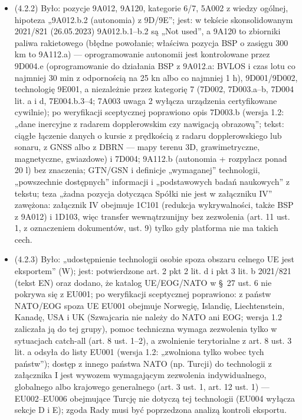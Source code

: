 \documentclass[12pt,a4paper]{report}
\begin{document}
\begin{itemize}
  \item (4.2.2) Było: pozycje 9A012, 9A120, kategorie 6/7, 5A002 z wiedzy ogólnej, hipoteza „9A012.b.2 (autonomia) z 9D/9E”; jest: w tekście skonsolidowanym 2021/821 (26.05.2023) 9A012.b.1--b.2 są „Not used”, a 9A120 to zbiorniki paliwa rakietowego (błędne powołanie; właściwa pozycja BSP o zasięgu 300 km to 9A112.a) --- oprogramowanie autonomii jest kontrolowane przez 9D004.e (oprogramowanie do działania BSP z 9A012.a: BVLOS i czas lotu co najmniej 30 min z odpornością na 25 kn albo co najmniej 1 h), 9D001/9D002, technologię 9E001, a niezależnie przez kategorię 7 (7D002, 7D003.a--b, 7D004 lit. a i d, 7E004.b.3--4; 7A003 uwaga 2 wyłącza urządzenia certyfikowane cywilnie); po weryfikacji sceptycznej poprawiono opis 7D003.b (wersja 1.2: „dane inercyjne z radarem dopplerowskim czy nawigacją obrazową”; tekst: ciągłe łączenie danych o kursie z prędkością z radaru dopplerowskiego lub sonaru, z GNSS albo z DBRN --- mapy terenu 3D, grawimetryczne, magnetyczne, gwiazdowe) i 7D004; 9A112.b (autonomia + rozpylacz ponad 20 l) bez znaczenia; GTN/GSN i definicje „wymaganej” technologii, „powszechnie dostępnych” informacji i „podstawowych badań naukowych” z tekstu; teza „żadna pozycja dotycząca Spółki nie jest w załączniku IV” zawężona: załącznik IV obejmuje 1C101 (redukcja wykrywalności, także BSP z 9A012) i 1D103, więc transfer wewnątrzunijny bez zezwolenia (art. 11 ust. 1, z oznaczeniem dokumentów, ust. 9) tylko gdy platforma nie ma takich cech.
  \item (4.2.3) Było: „udostępnienie technologii osobie spoza obszaru celnego UE jest eksportem” (W); jest: potwierdzone art. 2 pkt 2 lit. d i pkt 3 lit. b 2021/821 (tekst EN) oraz dodano, że katalog UE/EOG/NATO w §~27 ust. 6 nie pokrywa się z EU001; po weryfikacji sceptycznej poprawiono: z państw NATO/EOG spoza UE EU001 obejmuje Norwegię, Islandię, Liechtenstein, Kanadę, USA i UK (Szwajcaria nie należy do NATO ani EOG; wersja 1.2 zaliczała ją do tej grupy), pomoc techniczna wymaga zezwolenia tylko w sytuacjach catch-all (art. 8 ust. 1--2), a zwolnienie terytorialne z art. 8 ust. 3 lit. a odsyła do listy EU001 (wersja 1.2: „zwolniona tylko wobec tych państw”); dostęp z innego państwa NATO (np. Turcji) do technologii z załącznika I jest wywozem wymagającym zezwolenia indywidualnego, globalnego albo krajowego generalnego (art. 3 ust. 1, art. 12 ust. 1) --- EU002--EU006 obejmujące Turcję nie dotyczą tej technologii (EU004 wyłącza sekcje D i E); zgoda Rady musi być poprzedzona analizą kontroli eksportu.

\end{itemize}
\end{document}
